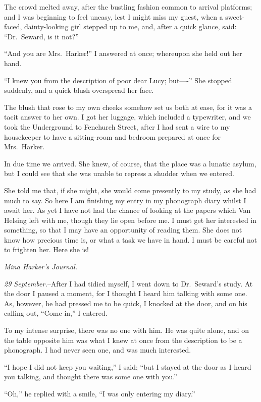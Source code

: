 \documentclass[12pt,openright]{book}
\begin{document}
The crowd melted away, after the bustling fashion common to arrival platforms; and I was beginning to feel uneasy, lest I might miss my guest, when a sweet-faced, dainty-looking girl stepped up to me, and, after a quick glance, said: “Dr. Seward, is it not?”

“And you are Mrs. Harker!” I answered at once; whereupon she held out her hand.

“I knew you from the description of poor dear Lucy; but—-” She stopped suddenly, and a quick blush overspread her face.

The blush that rose to my own cheeks somehow set us both at ease, for it was a tacit answer to her own. I got her luggage, which included a typewriter, and we took the Underground to Fenchurch Street, after I had sent a wire to my housekeeper to have a sitting-room and bedroom prepared at once for Mrs. Harker.

In due time we arrived. She knew, of course, that the place was a lunatic asylum, but I could see that she was unable to repress a shudder when we entered.

She told me that, if she might, she would come presently to my study, as she had much to say. So here I am finishing my entry in my phonograph diary whilst I await her. As yet I have not had the chance of looking at the papers which Van Helsing left with me, though they lie open before me. I must get her interested in something, so that I may have an opportunity of reading them. She does not know how precious time is, or what a task we have in hand. I must be careful not to frighten her. Here she is!

\textit{Mina Harker’s Journal.}

\textit{29 September.}–After I had tidied myself, I went down to Dr. Seward’s study. At the door I paused a moment, for I thought I heard him talking with some one. As, however, he had pressed me to be quick, I knocked at the door, and on his calling out, “Come in,” I entered.

To my intense surprise, there was no one with him. He was quite alone, and on the table opposite him was what I knew at once from the description to be a phonograph. I had never seen one, and was much interested.

“I hope I did not keep you waiting,” I said; “but I stayed at the door as I heard you talking, and thought there was some one with you.”

“Oh,” he replied with a smile, “I was only entering my diary.”
\end{document}
